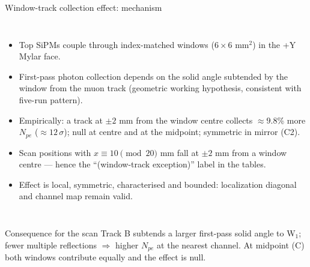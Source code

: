 \documentclass[aspectratio=169]{beamer}
\begin{document}
\begin{frame}{Window-track collection effect: mechanism}

\begin{columns}[T]
\begin{itemize}\footnotesize
  \item Top SiPMs couple through index-matched windows
        ($6\times6$ mm$^2$) in the +Y Mylar face.
  \item First-pass photon collection depends on the solid angle
        subtended by the window from the muon track (geometric
        working hypothesis, consistent with five-run pattern).
  \item Empirically: a track at $\pm2$ mm from the window centre
        collects $\approx9.8$\% more $N_{pe}$ ($\approx12\,\sigma$);
        null at centre and at the midpoint; symmetric in mirror (C2).
  \item Scan positions with $x\equiv10\pmod{20}$ mm fall at
        $\pm2$ mm from a window centre --- hence the
        ``(window-track exception)'' label in the tables.
  \item Effect is local, symmetric, characterised and bounded:
        localization diagonal and channel map remain valid.
\end{itemize}
\end{columns}
\vspace*{-5pt}
\begin{alertblock}{\footnotesize Consequence for the scan}
\scriptsize Track B subtends a larger first-pass solid angle to W$_1$; fewer multiple
reflections $\Rightarrow$ higher $N_{pe}$ at the nearest channel.
At midpoint (C) both windows contribute equally and the effect is null.
\end{alertblock}

\end{frame}
\end{document}
